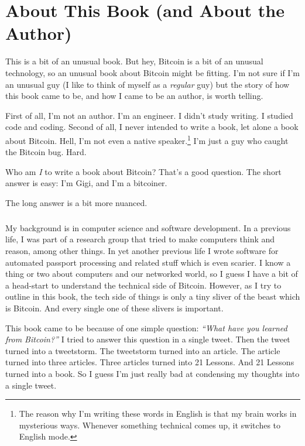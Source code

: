 
\def\bitcoinB{\leavevmode
  {\setbox0=\hbox{\textsf{B}}%
    \dimen0\ht0 \advance\dimen0 0.2ex
    \ooalign{\hfil \box0\hfil\cr
      \hfil\vrule height \dimen0 depth.2ex\hfil\cr
    }%
  }%
}

\chapter*{About This Book (and About the Author)}

This is a bit of an unusual book. But hey, Bitcoin is a bit of an unusual
technology, so an unusual book about Bitcoin might be fitting. I'm not sure if
I'm an unusual guy (I like to think of myself as a \textit{regular} guy) but the
story of how this book came to be, and how I came to be an author, is worth
telling.

First of all, I'm not an author. I'm an engineer. I didn't study writing. I
studied code and coding. Second of all, I never intended to write a book, let
alone a book about Bitcoin. Hell, I'm not even a native speaker.\footnote{The
reason why I'm writing these words in English is that my brain works in
mysterious ways. Whenever something technical comes up, it switches to English
mode.} I'm just a guy who caught the Bitcoin bug. Hard.

Who am \textit{I} to write a book about Bitcoin? That's a good question. The
short answer is easy: I'm Gigi, and I'm a bitcoiner.

The long answer is a bit more nuanced.

\paragraph{}
My background is in computer science and software development. In a
previous life, I was part of a research group that tried to make computers think
and reason, among other things. In yet another previous life I wrote software
for automated passport processing and related stuff which is even scarier. I
know a thing or two about computers and our networked world, so I guess I have a
bit of a head-start to understand the technical side of Bitcoin. However, as I
try to outline in this book, the tech side of things is only a tiny sliver of
the beast which is Bitcoin. And every single one of these slivers is important.

This book came to be because of one simple question: \textit{\enquote{What have
you learned from Bitcoin?}} I tried to answer this question in a single tweet.
Then the tweet turned into a tweetstorm. The tweetstorm turned into an article.
The article turned into three articles. Three articles turned into 21 Lessons.
And 21 Lessons turned into a book. So I guess I'm just really bad at condensing
my thoughts into a single tweet.

